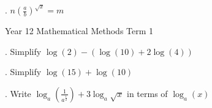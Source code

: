 \documentclass[12pt]{article}
\begin{document}
. \(n \left(\frac{a}{b}\right)^{\sqrt{x}} = m\)
\vspace{10mm} %
\noindent \makebox[\linewidth]{\dotfill} %
\vspace{10mm}
\noindent \makebox[\linewidth]{\dotfill}
\vspace{10mm}
\noindent \makebox[\linewidth]{\dotfill}

\vfill %
\flushleft


\newpage %

\noindent Year 12 Mathematical Methods \hfill Term 1

\vspace{10mm}. Simplify \(\log(2) - (\log(10) + 2\log(4))\)\vspace{10mm} 
\vspace{10mm} %
\noindent \makebox[\linewidth]{\dotfill} %
\vspace{10mm}
\noindent \makebox[\linewidth]{\dotfill}
\vspace{10mm}
\noindent \makebox[\linewidth]{\dotfill}

. Simplify \(\log(15) + \log(10)\)\vspace{10mm}
\vspace{10mm} %
\noindent \makebox[\linewidth]{\dotfill} %
\vspace{10mm}
\noindent \makebox[\linewidth]{\dotfill}
\vspace{10mm}
\noindent \makebox[\linewidth]{\dotfill}

. Write \(\log_a \left(\frac{1}{a^{\frac{1}{2}}}\right) + 3\log_a \sqrt{x}\) in terms of \(\log_a(x)\)\vspace{10mm}
\vspace{10mm} %
\noindent \makebox[\linewidth]{\dotfill} %
\vspace{10mm}
\noindent \makebox[\linewidth]{\dotfill}
\vspace{10mm}
\noindent \makebox[\linewidth]{\dotfill}

\vfill %
\flushleft
\newpage %
\end{document}
